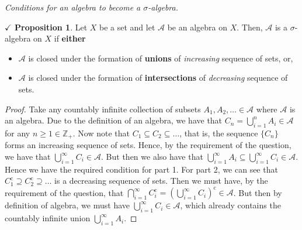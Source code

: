 \documentclass{article}
\theoremstyle{definition}
\theoremstyle{remark}
\theoremstyle{definition}
\theoremstyle{definition}
\newtheorem{proposition}{$\checkmark$ Proposition}
\theoremstyle{definition}
\newcommand{\bunion}{\bigcup}
\newcommand{\bintrs}{\bigcap}
\newcommand{\Z}{\mathbb{Z}}
\newcommand{\alg}[1]{\mathscr{#1}}
\newcommand{\comp}[1]{#1^{\text{c}}}
\begin{document}
\emph{Conditions for an algebra to become a $ \sigma $-algebra.}
\begin{proposition}
	\label{P-4}
	Let $ X $ be a set and let $ \alg{A} $ be an algebra on $ X $. Then, $ \alg{A} $ is a $ \sigma $-algebra on $ X $ if \textbf{either}
	\begin{itemize}
		\item {$ \alg{A} $ is closed under the formation of \textbf{unions} of \emph{increasing} sequence of sets, or,}
		\item {$ \alg{A} $ is closed under the formation of \textbf{intersections} of \emph{decreasing} sequence of sets.}
	\end{itemize}
\end{proposition}
\begin{proof}
	Take any countably infinite collection of subsets $ A_1,A_2,\dots \in \alg{A}$ where $ \alg{A} $ is an algebra. Due to the definition of an algebra, we have that $ C_n = \bunion_{i = 1}^n A_i \in \alg{A}$ for any $ n\ge 1\in \Z_+ $. Now note that $ C_1\subseteq C_2 \subseteq \dots  $, that is, the sequence $ \{C_n\} $ forms an increasing sequence of sets. Hence, by the requirement of the question, we have that $ \bunion_{i=1}^\infty C_i \in \alg{A} $. But then we also have that $ \bunion_{i = 1}^\infty A_i \subseteq \bunion_{i=1}^\infty C_i \in \alg{A}$. Hence we have the required condition for part 1. For part 2, we can see that $ \comp{C_1} \supseteq \comp{C_2} \supseteq \dots $ is a decreasing sequence of sets. Then we must have, by the requirement of the question, that $ \bintrs_{i=1}^{\infty} \comp{C_i} = \comp{\left (\bunion_{i=1}^\infty C_i\right )} \in \alg{A}$. But then by definition of algebra, we must have $ \bunion_{i=1}^\infty C_i\in \alg{A} $, which already contains the countably infinite union $ \bunion_{i=1}^\infty A_i $.
\end{proof}
\hrulefill
\newpage
\end{document}
